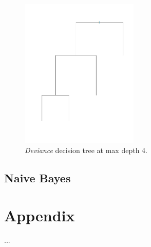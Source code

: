 \documentclass[a4paper, twocolumn]{article}
\begin{document}
	\begin{figure}
		\includegraphics[width=0.5\textwidth]{share/best_subtree.png}  
		\caption{\textit{Deviance} decision tree at max depth 4.\label{fig:best_subtree}}
	\end{figure}

	\subsection{Naive Bayes}
    
    \nocite{*} %
    
    
    \onecolumn \appendix
    \section*{Appendix}

        ...
\end{document}
